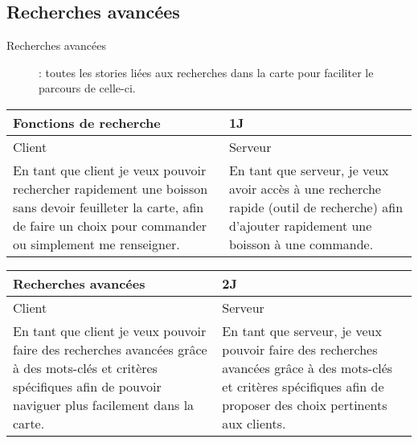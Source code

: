 \subsection{Recherches avancées}
\begin{description}
	\item[Recherches avancées] : toutes les stories liées aux recherches dans la carte pour faciliter le parcours de celle-ci.
\end{description}

\begin{center}
	\begin{tabular}{lll}
		\hline
			\multicolumn{2}{|p{14cm}}{Fonctions de recherche} & \multicolumn{1}{|p{0.7cm}|}{1J}\\
		\hline
			\multicolumn{1}{|p{7cm}}{Client} & \multicolumn{2}{|p{7cm}|}{Serveur}\\ 
		\hline
			\multicolumn{1}{|p{7cm}}{En tant que client je veux pouvoir rechercher
			rapidement une boisson sans devoir feuilleter la carte, afin de faire
			un choix pour commander ou simplement me renseigner.} 
			& \multicolumn{2}{|p{7cm}|}{En tant que serveur, je veux avoir accès 
			à une recherche rapide (outil de recherche) afin d'ajouter rapidement 
			une boisson à une commande.}\\ 
		\hline
	\end{tabular}

	\vspace{1cm}
	
	\begin{tabular}{lll}
		\hline
			\multicolumn{2}{|p{14cm}}{Recherches avancées} & \multicolumn{1}{|p{0.7cm}|}{2J} \\
		\hline
			\multicolumn{1}{|p{7cm}}{Client} & \multicolumn{2}{|p{7cm}|}{Serveur} \\ 
		\hline
			\multicolumn{1}{|p{7cm}}{En tant que client je veux pouvoir faire des
			recherches avancées grâce à des mots-clés et critères spécifiques afin de
			pouvoir naviguer plus facilement dans la carte.} 
			& \multicolumn{2}{|p{7cm}|}{En tant que serveur, je veux pouvoir faire
			des recherches avancées grâce à des mots-clés et critères spécifiques afin
			de proposer des choix pertinents aux clients.} \\ 
		\hline
	\end{tabular}
\end{center}

